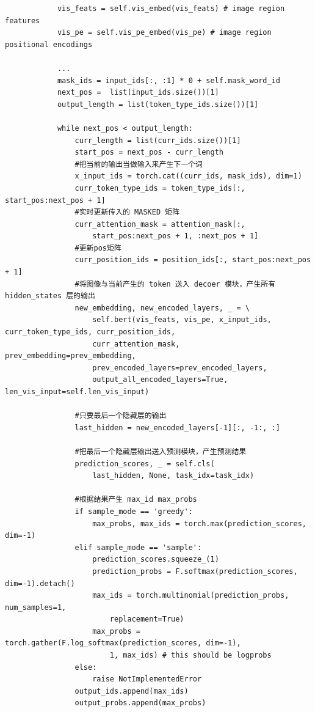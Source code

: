 \documentclass[a4paper]{article}
\begin{document}
\begin{sloppypar}
\begin{lstlisting}
            vis_feats = self.vis_embed(vis_feats) # image region features
            vis_pe = self.vis_pe_embed(vis_pe) # image region positional encodings

            ...
            mask_ids = input_ids[:, :1] * 0 + self.mask_word_id
            next_pos =  list(input_ids.size())[1]
            output_length = list(token_type_ids.size())[1]

            while next_pos < output_length:
                curr_length = list(curr_ids.size())[1]
                start_pos = next_pos - curr_length
                #把当前的输出当做输入来产生下一个词
                x_input_ids = torch.cat((curr_ids, mask_ids), dim=1)
                curr_token_type_ids = token_type_ids[:, start_pos:next_pos + 1]
                #实时更新传入的 MASKED 矩阵
                curr_attention_mask = attention_mask[:,
                    start_pos:next_pos + 1, :next_pos + 1]
                #更新pos矩阵
                curr_position_ids = position_ids[:, start_pos:next_pos + 1]
                #将图像与当前产生的 token 送入 decoer 模块，产生所有 hidden_states 层的输出
                new_embedding, new_encoded_layers, _ = \
                    self.bert(vis_feats, vis_pe, x_input_ids, curr_token_type_ids, curr_position_ids,
                    curr_attention_mask, prev_embedding=prev_embedding,
                    prev_encoded_layers=prev_encoded_layers,
                    output_all_encoded_layers=True, len_vis_input=self.len_vis_input)

                #只要最后一个隐藏层的输出
                last_hidden = new_encoded_layers[-1][:, -1:, :]

                #把最后一个隐藏层输出送入预测模块，产生预测结果
                prediction_scores, _ = self.cls(
                    last_hidden, None, task_idx=task_idx)

                #根据结果产生 max_id max_probs
                if sample_mode == 'greedy':
                    max_probs, max_ids = torch.max(prediction_scores, dim=-1)
                elif sample_mode == 'sample':
                    prediction_scores.squeeze_(1)
                    prediction_probs = F.softmax(prediction_scores, dim=-1).detach()
                    max_ids = torch.multinomial(prediction_probs, num_samples=1,
                        replacement=True)
                    max_probs = torch.gather(F.log_softmax(prediction_scores, dim=-1),
                        1, max_ids) # this should be logprobs
                else:
                    raise NotImplementedError
                output_ids.append(max_ids)
                output_probs.append(max_probs)
                

\end{lstlisting}
\end{sloppypar}
\end{document}
